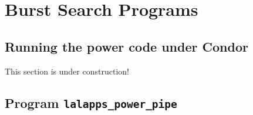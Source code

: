 
\chapter{Burst Search Programs}
\label{chapter:powertools}

 
\clearpage
\section{Running the power code under Condor}
\label{subsection:running_power}

This section is under construction!


\clearpage
\section{Program \texttt{lalapps\_power\_pipe}}
\label{program:lalapps-power-pipe}

